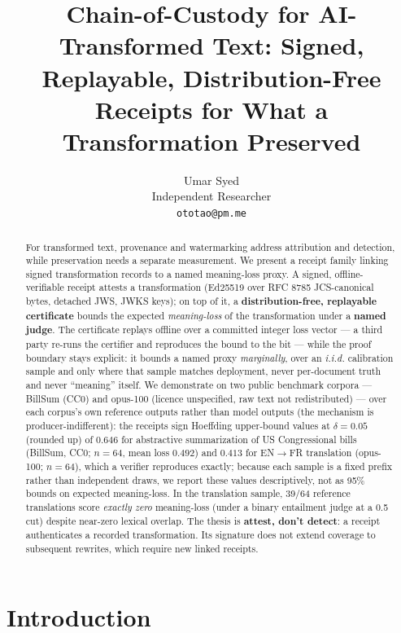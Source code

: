 \documentclass[11pt]{article}
\title{Chain-of-Custody for AI-Transformed Text: Signed, Replayable,
Distribution-Free Receipts for What a Transformation Preserved}
\author{Umar Syed\\ Independent Researcher\\ \texttt{ototao@pm.me}}
\date{}
\theoremstyle{definition}
\begin{document}
\maketitle

\begin{abstract}
For transformed text, provenance and watermarking address attribution and
detection, while preservation needs a separate measurement. We present a
receipt family linking signed transformation records to a named meaning-loss
proxy. A signed, offline-verifiable receipt attests a
transformation (Ed25519 over RFC 8785 JCS-canonical bytes, detached JWS,
JWKS keys); on top of it, a \textbf{distribution-free, replayable
certificate} bounds the expected \emph{meaning-loss} of the transformation
under a \textbf{named judge}. The certificate replays offline over a
committed integer loss vector --- a third party re-runs the certifier and
reproduces the bound to the bit --- while the proof boundary
stays explicit: it bounds a named proxy \emph{marginally}, over an
\emph{i.i.d.} calibration sample and only where that sample matches
deployment, never per-document truth and never ``meaning'' itself. We demonstrate on two public benchmark corpora --- BillSum (CC0) and
opus-100 (licence unspecified, raw text not redistributed) --- over each corpus's own
reference outputs rather than model outputs (the mechanism is
producer-indifferent): the receipts sign Hoeffding upper-bound values at
$\delta=0.05$ (rounded up) of $0.646$ for abstractive summarization of US
Congressional bills (BillSum, CC0; $n=64$, mean loss $0.492$) and $0.413$ for
EN$\to$FR translation (opus-100; $n=64$), which a verifier reproduces
exactly; because each sample is a fixed prefix rather than independent draws,
we report these values descriptively, not as 95\% bounds on expected
meaning-loss. In the translation sample, 39/64 reference translations score
\emph{exactly zero} meaning-loss (under a binary entailment judge at a 0.5
cut) despite near-zero lexical overlap. The thesis is \textbf{attest, don't
detect}: a receipt authenticates a recorded transformation. Its signature
does not extend coverage to subsequent rewrites, which require new linked
receipts.
\end{abstract}

\section{Introduction}\label{sec:intro}
\end{document}
